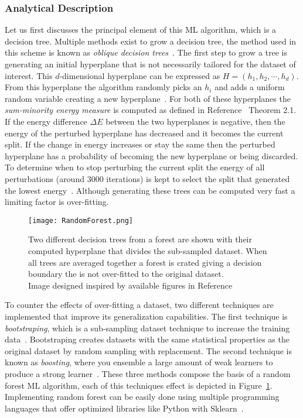    
\subsubsection{Analytical Description}

 Let us first discusses the principal element of this ML algorithm, which is a decision tree. Multiple methods exist to grow a decision tree, the method used in this scheme is known as  \textit{oblique decision trees}~\cite{ho1995random}.  The first step to grow a tree is generating an initial hyperplane that is not necessarily tailored for the dataset of interest. This $d$-dimensional hyperplane can be expressed as $H=(h_{1},h_{2},\cdots,h_{d})$. From this hyperplane the algorithm randomly picks an $h_{i}$ and adds a uniform random variable creating a new hyperplane~\cite{heath1993induction}. For both of these hyperplanes the \textit{sum-minority energy measure} is computed as defined in Reference~\cite{heath1993induction} Theorem 2.1. If the energy difference $\Delta E$ between the two hyperplanes is negative, then the energy of the perturbed hyperplane has decreased and it becomes the current split. If the change in energy increases or stay the same then the perturbed hyperplane has a probability of becoming the new hyperplane or being discarded. To determine when to stop perturbing the current split the energy of all perturbations (around 3000 iterations) is kept to select the split that generated the lowest energy~\cite{heath1993induction}. Although generating these trees can be computed very fast a limiting factor is over-fitting.~\\

\begin{figure}[h]
\centering
\texttt{[image: RandomForest.png]}
\caption{ Two different decision trees from a forest are shown  with their computed hyperplane that divides the sub-sampled dataset. When all trees are averaged together a forest is crated giving a decision boundary the is not over-fitted to the original dataset.\\ {\scriptsize Image designed inspired by available figures in Reference~\cite{RFimg}} }
\label{fig:RFshow}
\end{figure}

To counter the effects of over-fitting a dataset, two different techniques are implemented that improve its generalization capabilities. The first technique is \textit{ bootstraping}, which is a sub-sampling dataset technique to increase the training data~\cite{friedman2002stochastic}. Bootstraping creates datasets with the same statistical properties as the original dataset by random sampling with replacement. The second technique is known as \textit{boosting}, where you ensemble a large amount of weak learners to produce a strong learner~\cite{hancock2012bootstrapping}. These three methods compose the basis of a random forest ML algorithm, each of this techniques effect is depicted in Figure~\ref{fig:RFshow}. Implementing random forest can be easily done using multiple programming languages that offer optimized libraries like Python with Sklearn~\cite{scikit-learn}.

